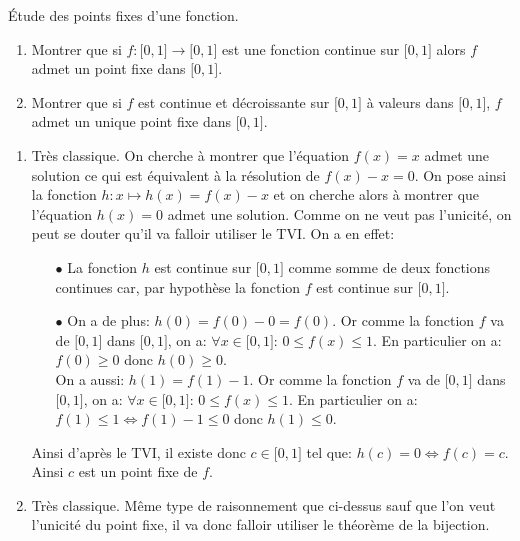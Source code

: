 \documentclass[a4paper, 11pt,reqno]{article}
\begin{document}
\begin{exercice}  \;
	\'Etude des points fixes d'une fonction.
	\begin{enumerate}
		\item Montrer que si $f: \lbrack 0,1\rbrack\rightarrow \lbrack 0,1\rbrack$ est une fonction continue sur $\lbrack 0,1\rbrack$ alors $f$
		      admet un  point fixe dans $\lbrack 0,1\rbrack$.
		\item Montrer que si $f$ est continue et d\'ecroissante sur $\lbrack 0,1\rbrack$ \`a valeurs dans $\lbrack 0,1\rbrack$, $f$ admet un unique point fixe dans $\lbrack 0,1\rbrack$.\\
	\end{enumerate}
\end{exercice}
\begin{correction}  \;
	\begin{enumerate}
		\item Tr\`{e}s classique. On cherche \`{a} montrer que l'\'equation $f(x)=x$ admet une solution ce qui est \'equivalent \`{a} la r\'esolution de $f(x)-x=0$. On pose ainsi la fonction $h: x\mapsto h(x)=f(x)-x$ et on cherche alors \`{a} montrer que l'\'equation $h(x)=0$ admet une solution. Comme on ne veut pas l'unicit\'e, on peut se douter qu'il va falloir utiliser le TVI. On a en effet:
		      \begin{itemize}
			      \item[$\bullet$] La fonction $h$ est continue sur $\lbrack 0,1\rbrack$ comme somme de deux fonctions continues car, par hypoth\`{e}se la fonction $f$ est continue sur $\lbrack 0,1\rbrack$.
			      \item[$\bullet$] On a de plus: $h(0)=f(0)-0=f(0)$. Or comme la fonction $f$ va de $\lbrack 0,1\rbrack$ dans $\lbrack 0,1\rbrack$, on a: $\forall x\in\lbrack 0,1\rbrack$: $0\leq f(x)\leq 1$. En particulier on a: $f(0)\geq 0$ donc $h(0)\geq 0$.\\
			            \noindent On a aussi: $h(1)=f(1)-1$. Or comme la fonction $f$ va de $\lbrack 0,1\rbrack$ dans $\lbrack 0,1\rbrack$, on a: $\forall x\in\lbrack 0,1\rbrack$: $0\leq f(x)\leq 1$. En particulier on a: $f(1)\leq 1\Leftrightarrow f(1)-1\leq 0$ donc $h(1)\leq 0$.
		      \end{itemize}
		      Ainsi d'apr\`{e}s le TVI, il existe donc $c\in\lbrack 0,1\rbrack$ tel que: $h(c)=0\Leftrightarrow f(c)=c$. Ainsi $c$ est un point fixe de $f$.
		\item Tr\`{e}s classique. M\^{e}me type de raisonnement que ci-dessus sauf que l'on veut l'unicit\'e du point fixe, il va donc falloir utiliser le th\'eor\`{e}me de la bijection.

\end{enumerate}
\end{correction}
\end{document}
